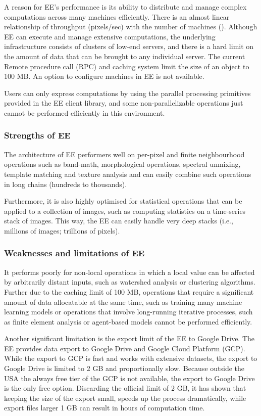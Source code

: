 A reason for EE's performance is its ability to distribute and manage complex computations across many machines efficiently. There is an almost linear relationship of throughput (pixels/sec) with the number of machines (\cite{gorelick2017google}).
Although EE can execute and manage extensive computations, the underlying infrastructure consists of clusters of low-end servers, and there is a hard limit on the amount of data that can be brought to any individual server. The current Remote procedure call (RPC) and caching system limit the size of an object to 100 MB. An option to configure machines in EE is not available.

Users can only express computations by using the parallel processing primitives provided in the EE client library, and some non-parallelizable operations just cannot be performed efficiently in this environment.

\subsubsection{Strengths of EE}

The architecture of EE performers well on per-pixel and finite neighbourhood operations such as band-math, morphological operations, spectral unmixing, template matching and texture analysis and can easily combine such operations in long chains (hundreds to thousands). 

Furthermore, it is also highly optimised for statistical operations
that can be applied to a collection of images, such as computing statistics on a time-series stack of images. This way, the EE can easily handle very deep stacks (i.e., millions of images; trillions of pixels). 

\subsubsection{Weaknesses and limitations of EE}

It performs poorly for non-local operations in which a local value can be affected by arbitrarily distant inputs, such as watershed analysis or clustering algorithms. Further due to the caching limit of 100 MB, operations that require a significant amount of data allocatable at the same time, such as training many machine learning models or operations that involve long-running iterative processes, such as finite element analysis or agent-based models cannot be performed efficiently. 

Another significant limitation is the export limit of the EE to Google Drive.
The EE provides data export to Google Drive and Google Cloud Platform (GCP). While the export to GCP is fast and works with extensive datasets, the export to Google Drive is limited to 2 GB and proportionally slow. Because outside the USA the always free tier of the GCP is not available, the export to Google Drive is the only free option. Discarding the official limit of 2 GB, it has shown that keeping the size of the export small,  speeds up the process dramatically, while export files larger 1 GB can result in hours of computation time. 

